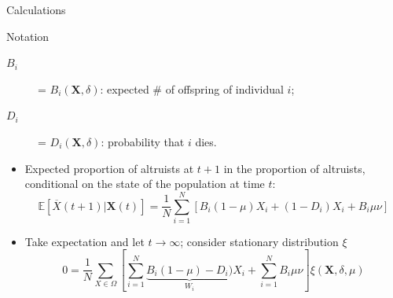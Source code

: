 \documentclass[aspectratio=169]{beamer}
\begin{document}
\begin{frame}{Calculations}
\begin{block}{Notation}
\begin{description}
\item[$B_i$] = $B_i(\mathbf{X}, \delta)$: expected \# of offspring of individual $i$;
\item[$D_i$] = $D_i(\mathbf{X}, \delta)$: probability that $i$ dies.
\end{description}
\end{block}
\pause
\begin{itemize}[<+->]
\item Expected proportion of altruists at $t+1$ in the proportion of altruists, conditional on the state of the population at time $t$:
%
\begin{displaymath}
\mathbb{E}[\overline{X}(t+1)|\mathbf{X}(t)] = \frac{1}{N}\sum_{i=1}^N \left[ B_i (1-\mu) X_i + (1-D_i)X_i + B_i \mu \nu \right]
\end{displaymath}

\item Take expectation and let $t\to \infty$; consider stationary distribution $\xi$
%
\begin{displaymath}
0 = \frac{1}{N} \sum_{X \in \Omega}\left[ \sum_{i=1}^N \underbrace{B_i (1-\mu) - D_i)}_{W_i} X_i + \sum_{i=1}^N B_i \mu \nu \right]\xi(\mathbf{X}, \delta, \mu)
\end{displaymath}
\end{itemize}
\end{frame}
\end{document}
